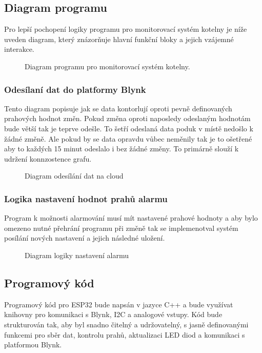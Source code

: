 \documentclass[12pt, twoside]{article} %
\begin{document}
\subsection{Diagram programu}
  Pro lepší pochopení logiky programu pro monitorovací systém kotelny je níže uveden diagram, který znázorňuje hlavní funkční bloky a jejich vzájemné interakce.
  \begin{figure}[H]
      \centering
      
      \caption{Diagram programu pro monitorovací systém kotelny.}
  \end{figure}

\subsubsection{Odesílaní dat do platformy Blynk}
  Tento diagram popisuje jak se data kontorlují oproti pevně definovaných prahových hodnot změn. Pokud změna oproti naposledy odeslaným hodnotám bude větší tak je teprve odešle.
  To šetří odeslaná data poduk v místě nedošlo k žádné změně. Ale pokud by se data opravdu vůbec neměnily tak je to ošetřené aby to každých 15 minut odeslalo i bez žádné změny. To primárně slouží k udržení konnzostence grafu. 
  \begin{figure}[H]
    \centering
    
    \caption{Diagram odesílání dat na cloud}
  \end{figure}

\subsubsection{Logika nastavení hodnot prahů alarmu}
  Program k možnosti alarmování musí mít nastavené prahové hodnoty a aby bylo omezeno nutné přehrání programu při změně tak se implemenotval systém posílání nových nastavení a jejich následné uložení.
  \begin{figure}[H]
    \centering
    
    \caption{Diagram logiky nastavení alarmu}
  \end{figure}

\subsection{Programový kód}
Programový kód pro ESP32 bude napsán v jazyce C++ a bude využívat knihovny pro komunikaci s Blynk, I2C a analogové vstupy. Kód bude strukturován tak, aby byl snadno čitelný a udržovatelný, s jasně definovanými funkcemi pro sběr dat, kontrolu prahů, aktualizaci LED diod a komunikaci s platformou Blynk.
\end{document}
